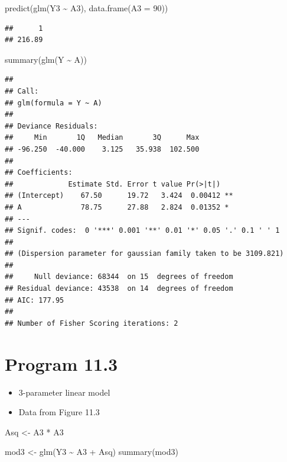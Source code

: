 \documentclass[
  10pt,
]{book}
\newenvironment{Shaded}{\begin{snugshade}}{\end{snugshade}}
\newcommand{\AttributeTok}[1]{\textcolor[rgb]{0.77,0.63,0.00}{#1}}
\newcommand{\DecValTok}[1]{\textcolor[rgb]{0.00,0.00,0.81}{#1}}
\newcommand{\FunctionTok}[1]{\textcolor[rgb]{0.00,0.00,0.00}{#1}}
\newcommand{\NormalTok}[1]{#1}
\newcommand{\OtherTok}[1]{\textcolor[rgb]{0.56,0.35,0.01}{#1}}
\newcommand{\SpecialCharTok}[1]{\textcolor[rgb]{0.00,0.00,0.00}{#1}}
\providecommand{\tightlist}{%
  \setlength{\itemsep}{0pt}\setlength{\parskip}{0pt}}
\begin{document}
\begin{Shaded}
\begin{Highlighting}[]
\FunctionTok{predict}\NormalTok{(}\FunctionTok{glm}\NormalTok{(Y3 }\SpecialCharTok{\textasciitilde{}}\NormalTok{ A3), }\FunctionTok{data.frame}\NormalTok{(}\AttributeTok{A3 =} \DecValTok{90}\NormalTok{))}
\end{Highlighting}
\end{Shaded}

\begin{verbatim}
##      1 
## 216.89
\end{verbatim}

\begin{Shaded}
\begin{Highlighting}[]
\FunctionTok{summary}\NormalTok{(}\FunctionTok{glm}\NormalTok{(Y }\SpecialCharTok{\textasciitilde{}}\NormalTok{ A))}
\end{Highlighting}
\end{Shaded}

\begin{verbatim}
## 
## Call:
## glm(formula = Y ~ A)
## 
## Deviance Residuals: 
##     Min       1Q   Median       3Q      Max  
## -96.250  -40.000    3.125   35.938  102.500  
## 
## Coefficients:
##             Estimate Std. Error t value Pr(>|t|)   
## (Intercept)    67.50      19.72   3.424  0.00412 **
## A              78.75      27.88   2.824  0.01352 * 
## ---
## Signif. codes:  0 '***' 0.001 '**' 0.01 '*' 0.05 '.' 0.1 ' ' 1
## 
## (Dispersion parameter for gaussian family taken to be 3109.821)
## 
##     Null deviance: 68344  on 15  degrees of freedom
## Residual deviance: 43538  on 14  degrees of freedom
## AIC: 177.95
## 
## Number of Fisher Scoring iterations: 2
\end{verbatim}

\hypertarget{program-11.3}{%
\section{Program 11.3}\label{program-11.3}}

\begin{itemize}
\tightlist
\item
  3-parameter linear model
\item
  Data from Figure 11.3
\end{itemize}

\begin{Shaded}
\begin{Highlighting}[]
\NormalTok{Asq }\OtherTok{\textless{}{-}}\NormalTok{ A3 }\SpecialCharTok{*}\NormalTok{ A3}

\NormalTok{mod3 }\OtherTok{\textless{}{-}} \FunctionTok{glm}\NormalTok{(Y3 }\SpecialCharTok{\textasciitilde{}}\NormalTok{ A3 }\SpecialCharTok{+}\NormalTok{ Asq)}
\FunctionTok{summary}\NormalTok{(mod3)}
\end{Highlighting}
\end{Shaded}
\end{document}
